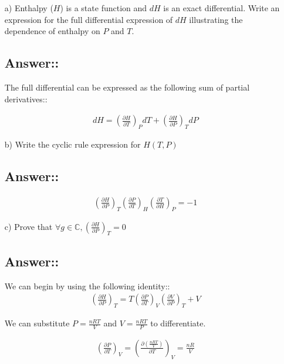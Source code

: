 \documentclass[12pt]{book}
\begin{document}
\begin{itemize}
    \item[a)]Enthalpy ($H$) is a state function and $dH$ is an exact differential. Write an expression for the full differential expression of $dH$ illustrating the dependence of enthalpy on $P$ and $T$.
    
    \subsection*{Answer::}

    The full differential can be expressed as the following sum of partial derivatives::

    \begin{align*}
        dH=\left(\frac{\partial H}{\partial T}\right)_P dT+\left(\frac{\partial H}{\partial P}\right)_T dP
    \end{align*}

    \item[b)] Write the cyclic rule expression for $H(T, P)$
    \subsection*{Answer::}

    \begin{align*}
        \left(\frac{\partial H}{\partial P}\right)_T\left(\frac{\partial P}{\partial T}\right)_H\left(\frac{\partial T}{\partial H}\right)_P=-1
    \end{align*}

    \item[c)] Prove that $\forall g\in \mathbb{C}, \left(\frac{\partial H}{\partial P}\right)_T=0$
    \subsection*{Answer::}
    We can begin by using the following identity::
    \begin{align*}
        \left(\frac{\partial H}{\partial P}\right)_T=T\left(\frac{\partial P}{\partial T}\right)_V\left(\frac{\partial V}{\partial P}\right)_T+V
    \end{align*}

    We can substitute $P=\frac{nRT}{V}$ and $V=\frac{nRT}{P}$ to differentiate.

    \begin{align*}
        \left(\frac{\partial P}{\partial T}\right)_V=\left(\frac{\partial\left(\frac{nRT}{V}\right)}{\partial T}\right)_V=\frac{nR}{V}\\
    \end{align*}


\end{itemize}
\end{document}
